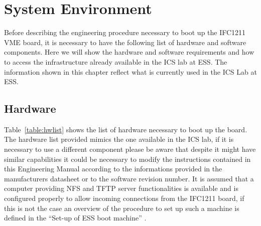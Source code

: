 \documentclass[11pt
  , a4paper
  , article
  , oneside
  , showtrims
]{memoir}
\begin{document}
\clearpage

\chapter{System Environment}
Before describing the engineering procedure necessary to boot up the IFC1211 VME board, it is necessary to have the following list of hardware and software components. Here we will show the hardware and software requirements and how to access the infrastructure already available in the ICS lab at ESS. The information shown in this chapter reflect what is currently used in the ICS Lab at ESS.


\section{Hardware}
Table~\ref{table:hwlist} shows the list of hardware necessary to boot up the board. The hardware list provided mimics the one available in the ICS lab, if it is necessary to use a different component please be aware that despite it might have similar capabilities it could be necessary to modify the instructions contained in this Engineering Manual according to the informations provided in the manufacturers datasheet or to the software revision number. It is assumed that a computer providing NFS and TFTP server functionalities is available and is configured properly to allow incoming connections from the IFC1211 board, if this is not the case an overview of the procedure to set up such a machine is defined in the ``Set-up of ESS boot machine'' \cite{SETUP_LAB_INFRASTRUCTURE}.
\end{document}
